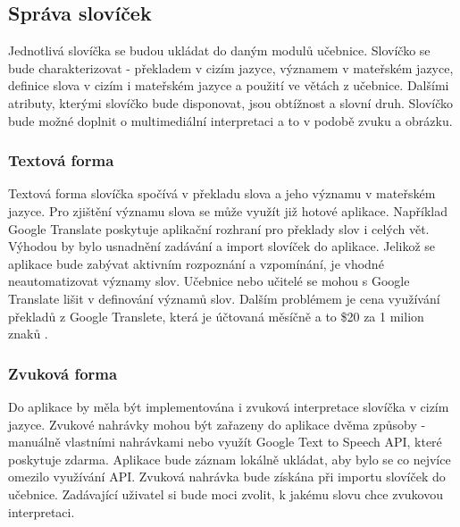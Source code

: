 \documentclass[a4paper,11pt,titlepage,fleqn]{article}
\begin{document}
    \subsection{Správa slovíček}

        Jednotlivá slovíčka se budou ukládat do daným modulů učebnice. Slovíčko se bude charakterizovat - překladem v cizím jazyce, významem v mateřském jazyce, definice slova v cizím i mateřském jazyce a použití ve větách z učebnice. Dalšími atributy, kterými slovíčko bude disponovat, jsou obtížnost a slovní druh. Slovíčko bude možné doplnit o multimediální interpretaci a to v podobě zvuku a obrázku.

        \subsubsection{Textová forma}
            Textová forma slovíčka spočívá v překladu slova a jeho významu v mateřském jazyce. Pro zjištění významu slova se může využít již hotové aplikace. Například Google Translate poskytuje aplikační rozhraní pro překlady slov i celých vět. Výhodou by bylo usnadnění zadávání a import slovíček do aplikace. Jelikož se aplikace bude zabývat aktivním rozpoznání a vzpomínání, je vhodné neautomatizovat významy slov. Učebnice nebo učitelé se mohou s Google Translate lišit v definování významů slov. Dalším problémem je cena využívání překladů z Google Translete, která je účtovaná měsíčně a to \$20 za 1 milion znaků \cite{bib:google-api}.

        \subsubsection{Zvuková forma}
            Do aplikace by měla být implementována i zvuková interpretace slovíčka v cizím jazyce. Zvukové nahrávky mohou být zařazeny do aplikace dvěma způsoby - manuálně vlastními nahrávkami nebo využít Google Text to Speech API, které poskytuje zdarma. Aplikace bude záznam lokálně ukládat, aby bylo se co nejvíce omezilo využívání API. Zvuková nahrávka bude získána při importu slovíček do učebnice. Zadávající uživatel si bude moci zvolit, k jakému slovu chce zvukovou interpretaci.
\end{document}
